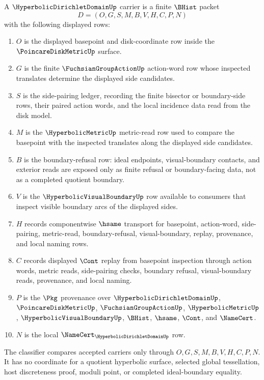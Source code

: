 \begin{definition}
\label{def:hyperbolic-dirichlet-domain-carrier}
A $\HyperbolicDirichletDomainUp$ carrier is a finite $\BHist$ packet
$$
D=(O,G,S,M,B,V,H,C,P,N)
$$
with the following displayed rows:
\begin{enumerate}
\item $O$ is the displayed basepoint and disk-coordinate row inside the $\PoincareDiskMetricUp$ surface.
\item $G$ is the finite $\FuchsianGroupActionUp$ action-word row whose inspected translates determine the displayed side candidates.
\item $S$ is the side-pairing ledger, recording the finite bisector or boundary-side rows, their paired action words, and the local incidence data read from the disk model.
\item $M$ is the $\HyperbolicMetricUp$ metric-read row used to compare the basepoint with the inspected translates along the displayed side candidates.
\item $B$ is the boundary-refusal row: ideal endpoints, visual-boundary contacts, and exterior reads are exposed only as finite refusal or boundary-facing data, not as a completed quotient boundary.
\item $V$ is the $\HyperbolicVisualBoundaryUp$ row available to consumers that inspect visible boundary arcs of the displayed sides.
\item $H$ records componentwise $\hsame$ transport for basepoint, action-word, side-pairing, metric-read, boundary-refusal, visual-boundary, replay, provenance, and local naming rows.
\item $C$ records displayed $\Cont$ replay from basepoint inspection through action words, metric reads, side-pairing checks, boundary refusal, visual-boundary reads, provenance, and local naming.
\item $P$ is the $\Pkg$ provenance over $\HyperbolicDirichletDomainUp$, $\PoincareDiskMetricUp$, $\FuchsianGroupActionUp$, $\HyperbolicMetricUp$, $\HyperbolicVisualBoundaryUp$, $\BHist$, $\hsame$, $\Cont$, and $\NameCert$.
\item $N$ is the local $\NameCert_{\HyperbolicDirichletDomainUp}$ row.
\end{enumerate}
The classifier compares accepted carriers only through $O,G,S,M,B,V,H,C,P,N$. It has no coordinate for a quotient hyperbolic surface, selected global tessellation, host discreteness proof, moduli point, or completed ideal-boundary equality.
\end{definition}

